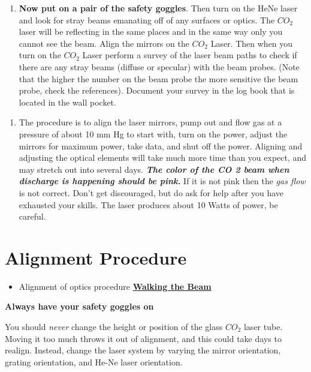 \documentclass{../lab}
\begin{document}
\begin{enumerate}
    \item \textbf{Now put on a pair of the safety goggles}. Then turn on the HeNe laser and look for stray beams emanating off of any surfaces or optics. The $CO_2 $ laser will be reflecting in the same places and in the same way only you cannot see the beam. Align the mirrors on the $CO_2 $ Laser. Then when you turn on the $CO_2 $ Laser perform a survey of the laser beam paths to check if there are any stray beams (diffuse or specular) with the beam probes. (Note that the higher the number on the beam probe the more sensitive the beam probe, check the references). Document your survey in the log book that is located in the wall pocket.
\end{enumerate}

\begin{enumerate}
    \item The procedure is to align the laser mirrors, pump out and flow gas at a pressure of about 10 mm Hg to start with, turn on the power, adjust the mirrors for maximum power, take data, and shut off the power. Aligning and adjusting the optical elements will take much more time than you expect, and may stretch out into several days.\emph{\textbf{ The color of the CO 2 beam when discharge is happening should be pink.}}  If it is not pink then the \emph{gas flow }is not correct. Don't get discouraged, but do ask for help after you have exhausted your skills. The laser produces about 10 Watts of power, be careful.
\end{enumerate}

\section{Alignment Procedure}

\begin{itemize}
    \item Alignment of optics procedure \href{http://physics111.lib.berkeley.edu/Physics111/Reprints/CO2/Walking\%20the\%20Beam.pdf}{\textbf{Walking the Beam}}
\end{itemize}

\textbf{Always have your safety goggles on}

You should \emph{never} change the height or position of the glass $CO_2 $ laser tube. Moving it too much throws it out of alignment, and this could take days to realign. Instead, change the laser system by varying the mirror orientation, grating orientation, and He-Ne laser orientation.
\end{document}
